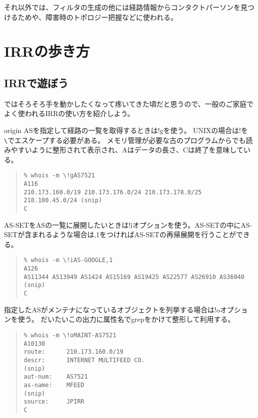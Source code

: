 それ以外では、フィルタの生成の他には経路情報からコンタクトパーソンを見つけるためや、障害時のトポロジー把握などに使われる。

\section{IRRの歩き方}

\subsection{IRRで遊ぼう}
ではそろそろ手を動かしたくなって疼いてきた頃だと思うので、一般のご家庭でよく使われるIRRの使い方を紹介しよう。

origin ASを指定して経路の一覧を取得するときは!gを使う。
UNIXの場合は!を\verb+\+でエスケープする必要がある。
メモリ管理が必要な古のプログラムからでも読みやすいように整形されて表示され、Aはデータの長さ、Cは終了を意味している。

\begin{quote}
\begin{minilinespace}
\begin{verbatim}
% whois -m \!gAS7521
A116
210.173.160.0/19 210.173.176.0/24 210.173.178.0/25 218.100.45.0/24 (snip)
C
\end{verbatim}
\end{minilinespace}
\end{quote}

AS-SETをASの一覧に展開したいときは!iオプションを使う。AS-SETの中にAS-SETが含まれるような場合は,1をつければAS-SETの再帰展開を行うことができる。

 \newpage

\begin{quote}
\begin{minilinespace}
\begin{verbatim}
% whois -m \!iAS-GOOGLE,1 
A126
AS11344 AS13949 AS1424 AS15169 AS19425 AS22577 AS26910 AS36040 (snip)
C
\end{verbatim}
\end{minilinespace}
\end{quote}

指定したASがメンテナになっているオブジェクトを列挙する場合は!oオプションを使う。
だいたいこの出力に属性名でgrepをかけて整形して利用する。

\begin{quote}
\begin{minilinespace}
\begin{verbatim}
% whois -m \!oMAINT-AS7521 
A10130
route:      210.173.160.0/19
descr:      INTERNET MULTIFEED CO.
(snip)
aut-num:    AS7521
as-name:    MFEED
(snip)
source:     JPIRR
C
\end{verbatim}
\end{minilinespace}
\end{quote}


